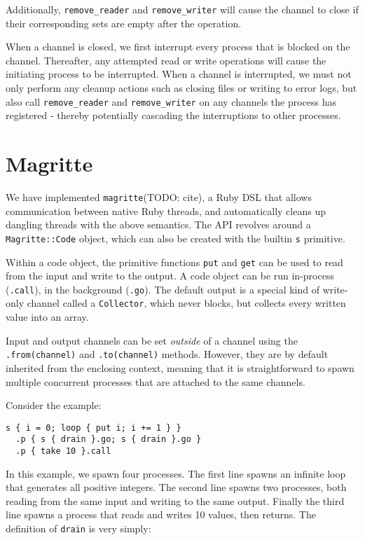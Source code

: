 \documentclass[sigplan,10pt,nosumlimits]{acmart}
\begin{document}
Additionally, \verb/remove_reader/ and \verb/remove_writer/ will cause the channel to close if their corresponding sets are empty after the operation.

When a channel is closed, we first interrupt every process that is blocked on the channel.
Thereafter, any attempted read or write operations will cause the initiating process to be interrupted.
When a channel is interrupted, we must not only perform any cleanup actions such as closing files or writing to error logs, but also call \verb/remove_reader/ and \verb/remove_writer/ on any channels the process has registered - thereby potentially cascading the interruptions to other processes.


\section{Magritte}

We have implemented \verb/magritte/(TODO: cite), a Ruby DSL that allows communication between native Ruby threads, and automatically cleans up dangling threads with the above semantics.
The API revolves around a \verb/Magritte::Code/ object, which can also be created with the builtin \verb/s/ primitive.

Within a code object, the primitive functions \verb/put/ and \verb/get/ can be used to read from the input and write to the output.
A code object can be run in-process (\verb/.call/), in the background (\verb/.go/).
The default output is a special kind of write-only channel called a \verb/Collector/, which never blocks, but collects every written value into an array.

Input and output channels can be set \emph{outside} of a channel using the \verb/.from(channel)/ and \verb/.to(channel)/ methods.
However, they are by default inherited from the enclosing context, meaning that it is straightforward to spawn multiple concurrent processes that are attached to the same channels.

Consider the example:

\begin{verbatim}
s { i = 0; loop { put i; i += 1 } }
  .p { s { drain }.go; s { drain }.go }
  .p { take 10 }.call
\end{verbatim}
In this example, we spawn four processes.
The first line spawns an infinite loop that generates all positive integers.
The second line spawns two processes, both reading from the same input and writing to the same output.
Finally the third line spawns a process that reads and writes 10 values, then returns. The definition of \verb/drain/ is very simply:
\end{document}
